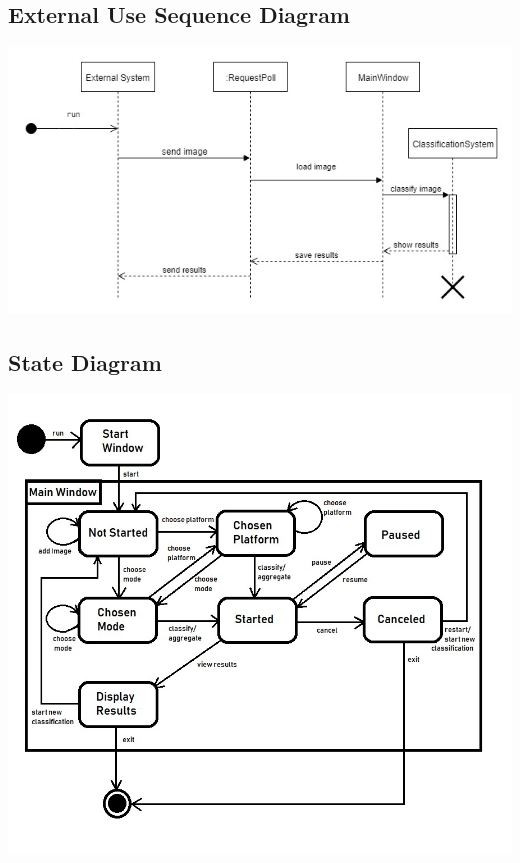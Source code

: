 \documentclass[parskip=full]{scrartcl}
\begin{document}
\subsection {External Use Sequence Diagram}

\begin{center}
\includegraphics[width=1.0\textwidth]{Untitled Diagram.jpg}
\end{center}

\pagebreak

\subsection {State Diagram}

\begin{center}
\includegraphics[width=1.0\textwidth]{StateDiag.jpg}
\end{center}

\pagebreak
\end{document}

